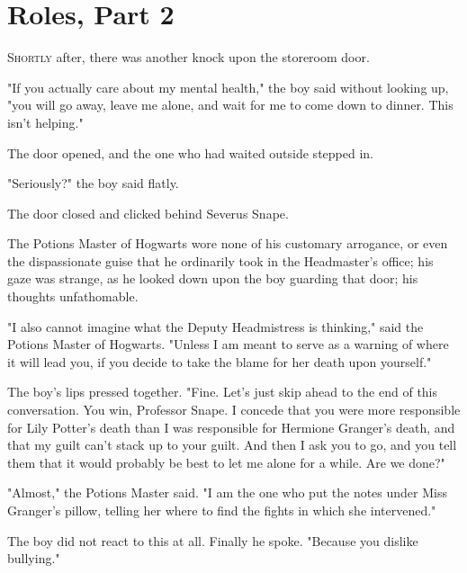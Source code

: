 \chapter{Roles, Part 2}

\lettrine{S}{hortly} after, there was another knock upon the storeroom door.

"If you actually care about my mental health," the boy said without looking up,
"you will go away, leave me alone, and wait for me to come down to dinner. This
isn't helping."

The door opened, and the one who had waited outside stepped in.

"Seriously?" the boy said flatly.

The door closed and clicked behind Severus Snape.

The Potions Master of Hogwarts wore none of his customary arrogance, or even
the dispassionate guise that he ordinarily took in the Headmaster's office; his
gaze was strange, as he looked down upon the boy guarding that door; his
thoughts unfathomable.

"I also cannot imagine what the Deputy Headmistress is thinking," said the
Potions Master of Hogwarts. "Unless I am meant to serve as a warning of where
it will lead you, if you decide to take the blame for her death upon yourself."

The boy's lips pressed together. "Fine. Let's just skip ahead to the end of
this conversation. You win, Professor Snape. I concede that you were more
responsible for Lily Potter's death than I was responsible for Hermione
Granger's death, and that my guilt can't stack up to your guilt. And then I ask
you to go, and you tell them that it would probably be best to let me alone for
a while. Are we done?"

"Almost," the Potions Master said. "I am the one who put the notes under Miss
Granger's pillow, telling her where to find the fights in which she intervened."

The boy did not react to this at all. Finally he spoke. "Because you dislike
bullying."

